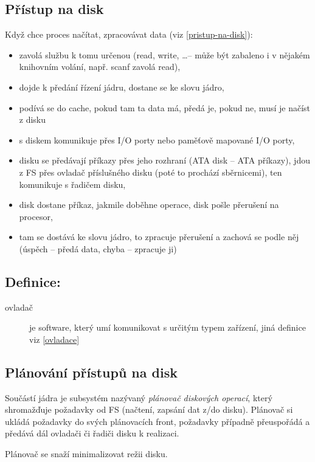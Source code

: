 \documentclass[a4paper, 11pt]{article}
\begin{document}
\subsection{Přístup na disk} \label{pristup-na-disk-detailed}
Když chce proces načítat, zpracovávat data (viz \ref{pristup-na-disk}):
\begin{itemize}
\item zavolá službu k tomu určenou (read, write, \ldots -- může být zabaleno i v nějakém knihovním volání, např. scanf zavolá read),
\item dojde k předání řízení jádru, dostane se ke slovu jádro,
\item podívá se do cache, pokud tam ta data má, předá je, pokud ne, musí je načíst z disku
\item s diskem komunikuje přes I/O porty nebo paměťově mapované I/O porty,
\item disku se předávají příkazy přes jeho rozhraní (ATA disk -- ATA příkazy), jdou z FS přes ovladač příslušného disku (poté to prochází sběrnicemi), ten komunikuje s řadičem disku,
\item disk dostane příkaz, jakmile doběhne operace, disk pošle přerušení na procesor,
\item tam se dostává ke slovu jádro, to zpracuje přerušení a zachová se podle něj (úspěch -- předá data, chyba -- zpracuje ji)
\end{itemize}

\subsection*{Definice:} \label{ovladac}
\begin{description}
\item[ovladač] je software, který umí komunikovat s určitým typem zařízení, jiná definice viz \ref{ovladace}
\end{description}

\subsection{Plánování přístupů na disk}
Součástí jádra je subsystém nazývaný \emph{plánovač diskových operací}, který shromažďuje požadavky od FS (načtení, zapsání dat z/do disku). Plánovač si ukládá požadavky do svých plánovacích front, požadavky případně přeuspořádá a předává dál ovladači či řadiči disku k realizaci.

Plánovač se snaží minimalizovat režii disku. 
 
\end{document}
